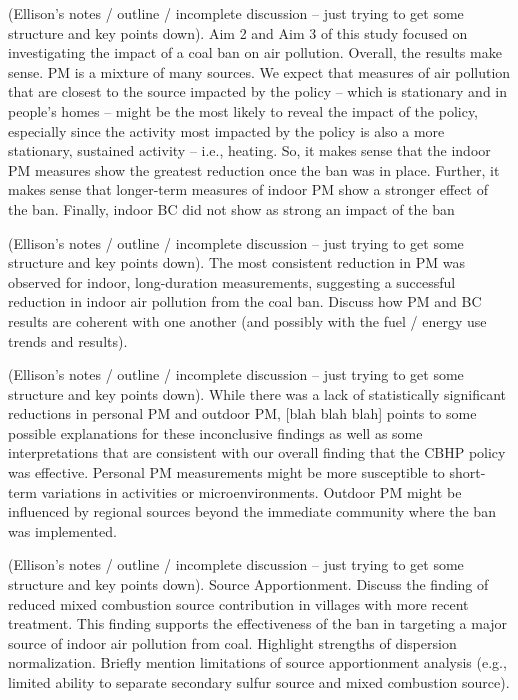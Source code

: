 \documentclass[
  letterpaper,
  DIV=11,
  numbers=noendperiod]{scrartcl}
\begin{document}
(Ellison's notes / outline / incomplete discussion -- just trying to get
some structure and key points down). Aim 2 and Aim 3 of this study
focused on investigating the impact of a coal ban on air pollution.
Overall, the results make sense. PM is a mixture of many sources. We
expect that measures of air pollution that are closest to the source
impacted by the policy -- which is stationary and in people's homes --
might be the most likely to reveal the impact of the policy, especially
since the activity most impacted by the policy is also a more
stationary, sustained activity -- i.e., heating. So, it makes sense that
the indoor PM measures show the greatest reduction once the ban was in
place. Further, it makes sense that longer-term measures of indoor PM
show a stronger effect of the ban. Finally, indoor BC did not show as
strong an impact of the ban

(Ellison's notes / outline / incomplete discussion -- just trying to get
some structure and key points down). The most consistent reduction in PM
was observed for indoor, long-duration measurements, suggesting a
successful reduction in indoor air pollution from the coal ban. Discuss
how PM and BC results are coherent with one another (and possibly with
the fuel / energy use trends and results).

(Ellison's notes / outline / incomplete discussion -- just trying to get
some structure and key points down). While there was a lack of
statistically significant reductions in personal PM and outdoor PM,
{[}blah blah blah{]} points to some possible explanations for these
inconclusive findings as well as some interpretations that are
consistent with our overall finding that the CBHP policy was effective.
Personal PM measurements might be more susceptible to short-term
variations in activities or microenvironments. Outdoor PM might be
influenced by regional sources beyond the immediate community where the
ban was implemented.

(Ellison's notes / outline / incomplete discussion -- just trying to get
some structure and key points down). Source Apportionment. Discuss the
finding of reduced mixed combustion source contribution in villages with
more recent treatment. This finding supports the effectiveness of the
ban in targeting a major source of indoor air pollution from coal.
Highlight strengths of dispersion normalization. Briefly mention
limitations of source apportionment analysis (e.g., limited ability to
separate secondary sulfur source and mixed combustion source).
\end{document}
